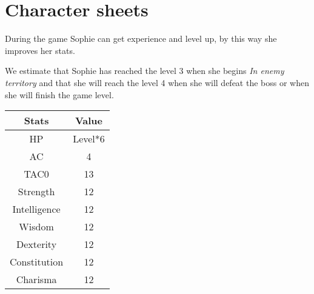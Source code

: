\section{Character sheets}
During the game Sophie can get experience and level up, by this way she improves her stats.

We estimate that Sophie has reached the level 3 when she begins \textit{In enemy territory} and that she will reach the level 4 when she will defeat the boss or when she will finish the game level.
\begin{table}[H]
  \centering
  \begin{tabular}{|c|c|}
    \hline
    \rowcolor[HTML]{C0C0C0}
    \textbf{Stats} & \textbf{Value} \\ \hline
    HP & Level*6 \\ \hline
    AC & 4 \\ \hline
    TAC0 & 13 \\ \hline
    Strength & 12 \\ \hline
    Intelligence & 12 \\ \hline
    Wisdom & 12  \\ \hline
    Dexterity & 12 \\ \hline
    Constitution & 12  \\ \hline
    Charisma & 12 \\ \hline
  \end{tabular}
\end{table}
